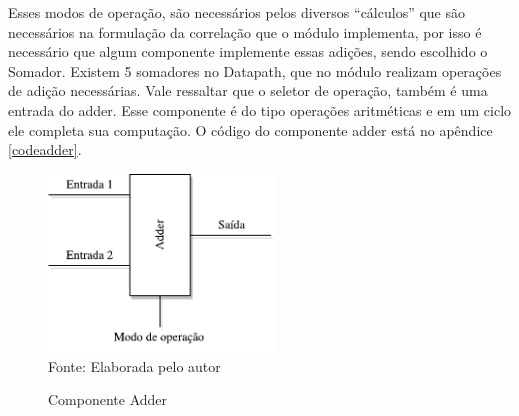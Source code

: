 Esses modos de operação, são necessários pelos diversos “cálculos” que são necessários na formulação da correlação que o módulo implementa, por isso  é necessário que algum componente implemente essas adições, sendo escolhido o Somador.
Existem 5 somadores no Datapath, que no módulo realizam operações de adição necessárias. Vale ressaltar que o seletor de operação, também é uma entrada do adder. Esse componente é do tipo operações aritméticas e em um ciclo ele completa sua computação. O código do componente adder está no apêndice \ref{codeadder}.

\begin{figure}[H]
	\centering
		\caption{Componente Adder}
	\includegraphics[width=6cm]{figures/Adder.pdf}\\

	{Fonte: Elaborada pelo autor}
	\label{adder}
\end{figure}

